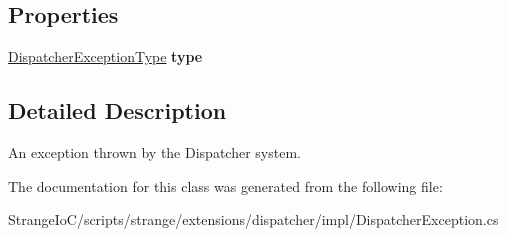 \subsection*{Properties}
\begin{DoxyCompactItemize}
\item 
\hypertarget{classstrange_1_1extensions_1_1dispatcher_1_1impl_1_1_dispatcher_exception_aaf683623803cc7c0b0cc725ed6349a3b}{\hyperlink{namespacestrange_1_1extensions_1_1dispatcher_1_1api_a03ba459ad62cc042c88405d9419eb4c6}{Dispatcher\-Exception\-Type} {\bfseries type}}\label{classstrange_1_1extensions_1_1dispatcher_1_1impl_1_1_dispatcher_exception_aaf683623803cc7c0b0cc725ed6349a3b}

\end{DoxyCompactItemize}


\subsection{Detailed Description}
An exception thrown by the Dispatcher system. 

The documentation for this class was generated from the following file\-:\begin{DoxyCompactItemize}
\item 
Strange\-Io\-C/scripts/strange/extensions/dispatcher/impl/Dispatcher\-Exception.\-cs\end{DoxyCompactItemize}
